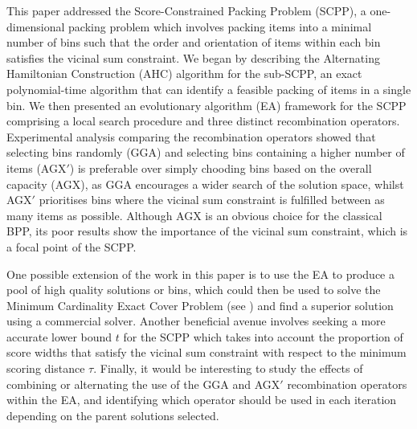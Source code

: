 \documentclass[a4paper,11pt,authoryear]{elsarticle}
\begin{document}
\noindent This paper addressed the Score-Constrained Packing Problem (SCPP), a one-dimensional packing problem which involves packing items into a minimal number of bins such that the order and orientation of items within each bin satisfies the vicinal sum constraint. We began by describing the Alternating Hamiltonian Construction (AHC) algorithm for the sub-SCPP, an exact polynomial-time algorithm that can identify a feasible packing of items in a single bin. We then presented an evolutionary algorithm (EA) framework for the SCPP comprising a local search procedure and three distinct recombination operators. Experimental analysis comparing the recombination operators showed that selecting bins randomly (GGA) and selecting bins containing a higher number of items (AGX$'$) is preferable over simply chooding bins based on the overall capacity (AGX), as GGA encourages a wider search of the solution space, whilst AGX$'$ prioritises bins where the vicinal sum constraint is fulfilled between as many items as possible. Although AGX is an obvious choice for the classical BPP, its poor results show the importance of the vicinal sum constraint, which is a focal point of the SCPP.

One possible extension of the work in this paper is to use the EA to produce a pool of high quality solutions or bins, which could then be used to solve the Minimum Cardinality Exact Cover Problem (see \citet{hawa2020t}) and find a superior solution using a commercial solver. Another beneficial avenue involves seeking a more accurate lower bound $t$ for the SCPP which takes into account the proportion of score widths that satisfy the vicinal sum constraint with respect to the minimum scoring distance $\tau$. Finally, it would be interesting to study the effects of combining or alternating the use of the GGA and AGX$'$ recombination operators within the EA, and identifying which operator should be used in each iteration depending on the parent solutions selected.



\end{document}
